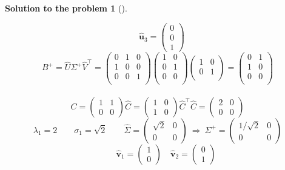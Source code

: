 \documentclass[12pt,a4]{article}
\newtheorem{solution}{Solution to the problem}
\newcommand{\bu}{{\mathbf u}}
\newcommand{\bv}{{\mathbf v}}
\begin{document}
\begin{solution}[]
\begin{enumerate}[(a)]
\[\quad
\hat \bu_3 = \begin{pmatrix} 0 \\ 0 \\ 1 \end{pmatrix}
\]
\[
B^+ = \hat U \Sigma^+ \hat V^\top = 
\begin{pmatrix}
0 & 1 & 0 \\
1 & 0 & 0 \\
0 & 0 & 1 \\
\end{pmatrix}
\begin{pmatrix}
1 & 0 \\
0 & 1 \\
0 & 0 \\
\end{pmatrix}
\begin{pmatrix}
1 & 0 \\
0 & 1 \\
\end{pmatrix}
=
\begin{pmatrix}
0 & 1 \\
1 & 0 \\
0 & 0 \\
\end{pmatrix}
\]
\\[10pt]
\[
C =
\begin{pmatrix}
1 & 1 \\ 0 & 0
\end{pmatrix}
\hat C =
\begin{pmatrix}
1 & 0 \\ 1 & 0
\end{pmatrix}
\hat C^\top \hat C = 
\begin{pmatrix}
2 & 0 \\ 0 & 0
\end{pmatrix}
\]
\[
\lambda_1 = 2
\qquad
\sigma_1 = \sqrt2
\qquad
\hat \Sigma = 
\begin{pmatrix}
\sqrt2 & 0 \\ 0 & 0
\end{pmatrix}
~\Rightarrow~
\Sigma^+ = 
\begin{pmatrix}
1/\sqrt2 & 0 \\ 0 & 0
\end{pmatrix}
\]
\[
\qquad
\hat \bv_1 = \begin{pmatrix} 1 \\ 0 \end{pmatrix}
\quad
\hat \bv_2 = \begin{pmatrix} 0 \\ 1 \end{pmatrix}
\]
\end{enumerate}
\end{solution}
\end{document}
